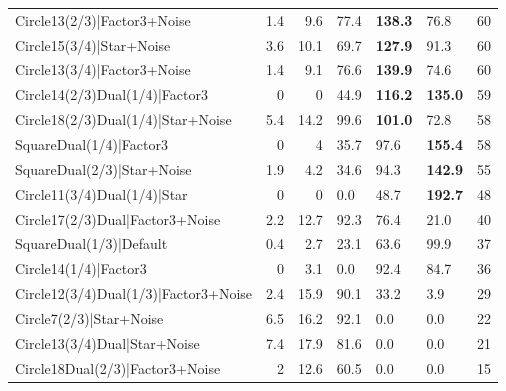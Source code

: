 \begin{tabular}{lrrlllr}
 Circle13(2/3)|Factor3+Noise          &          1.4 &            9.6 & 77.4           & \textbf{138.3} & 76.8           &           60 \\
 Circle15(3/4)|Star+Noise             &          3.6 &           10.1 & 69.7           & \textbf{127.9} & 91.3           &           60 \\
 Circle13(3/4)|Factor3+Noise          &          1.4 &            9.1 & 76.6           & \textbf{139.9} & 74.6           &           60 \\
 Circle14(2/3)Dual(1/4)|Factor3       &          0   &            0   & 44.9           & \textbf{116.2} & \textbf{135.0} &           59 \\
 Circle18(2/3)Dual(1/4)|Star+Noise    &          5.4 &           14.2 & 99.6           & \textbf{101.0} & 72.8           &           58 \\
 SquareDual(1/4)|Factor3              &          0   &            4   & 35.7           & 97.6           & \textbf{155.4} &           58 \\
 SquareDual(2/3)|Star+Noise           &          1.9 &            4.2 & 34.6           & 94.3           & \textbf{142.9} &           55 \\
 Circle11(3/4)Dual(1/4)|Star          &          0   &            0   & 0.0            & 48.7           & \textbf{192.7} &           48 \\
 Circle17(2/3)Dual|Factor3+Noise      &          2.2 &           12.7 & 92.3           & 76.4           & 21.0           &           40 \\
 SquareDual(1/3)|Default              &          0.4 &            2.7 & 23.1           & 63.6           & 99.9           &           37 \\
 Circle14(1/4)|Factor3                &          0   &            3.1 & 0.0            & 92.4           & 84.7           &           36 \\
 Circle12(3/4)Dual(1/3)|Factor3+Noise &          2.4 &           15.9 & 90.1           & 33.2           & 3.9            &           29 \\
 Circle7(2/3)|Star+Noise              &          6.5 &           16.2 & 92.1           & 0.0            & 0.0            &           22 \\
 Circle13(3/4)Dual|Star+Noise         &          7.4 &           17.9 & 81.6           & 0.0            & 0.0            &           21 \\
 Circle18Dual(2/3)|Factor3+Noise      &          2   &           12.6 & 60.5           & 0.0            & 0.0            &           15 \\

\end{tabular}
